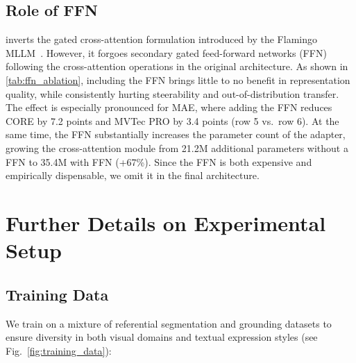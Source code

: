 
\subsection{Role of FFN}




\model{} inverts the gated cross-attention formulation introduced by the Flamingo MLLM~\cite{alayrac2022flamingo}. However, it forgoes secondary gated feed-forward networks (FFN) following the cross-attention operations in the original architecture. As shown in \cref{tab:ffn_ablation}, including the FFN brings little to no benefit in representation quality, while consistently hurting steerability and out-of-distribution transfer. The effect is especially pronounced for MAE, where adding the FFN reduces CORE by 7.2 points and MVTec PRO by 3.4 points (row 5 vs.\ row 6). At the same time, the FFN substantially increases the parameter count of the adapter, growing the cross-attention module from 21.2M additional parameters without a FFN to 35.4M with FFN (\mbox{+67\%}). Since the FFN is both expensive and empirically dispensable, we omit it in the final architecture.

\section{Further Details on Experimental Setup}
\label{apdx:exp_details}


\subsection{Training Data}
\label{apdx:data}

We train on a mixture of referential segmentation and grounding datasets to ensure diversity in both visual domains and textual expression styles (see Fig.~\ref{fig:training_data}):

